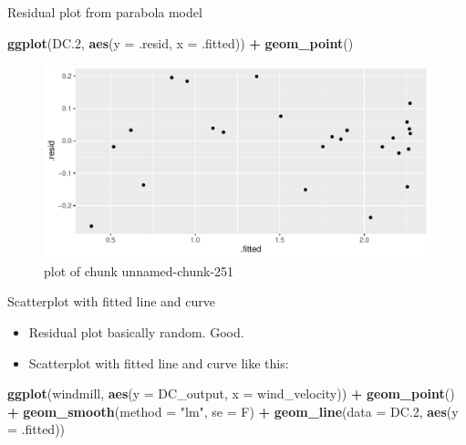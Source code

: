 \documentclass[
  ignorenonframetext,
]{beamer}
\newenvironment{Shaded}{\begin{snugshade}}{\end{snugshade}}
\newcommand{\DataTypeTok}[1]{\textcolor[rgb]{0.13,0.29,0.53}{#1}}
\newcommand{\FloatTok}[1]{\textcolor[rgb]{0.00,0.00,0.81}{#1}}
\newcommand{\KeywordTok}[1]{\textcolor[rgb]{0.13,0.29,0.53}{\textbf{#1}}}
\newcommand{\NormalTok}[1]{#1}
\newcommand{\OperatorTok}[1]{\textcolor[rgb]{0.81,0.36,0.00}{\textbf{#1}}}
\newcommand{\StringTok}[1]{\textcolor[rgb]{0.31,0.60,0.02}{#1}}
\providecommand{\tightlist}{%
  \setlength{\itemsep}{0pt}\setlength{\parskip}{0pt}}
\begin{document}
\begin{frame}[fragile]{Residual plot from parabola model}
\protect\hypertarget{residual-plot-from-parabola-model}{}

\begin{Shaded}
\begin{Highlighting}[]
\KeywordTok{ggplot}\NormalTok{(DC}\FloatTok{.2}\NormalTok{, }\KeywordTok{aes}\NormalTok{(}\DataTypeTok{y =}\NormalTok{ .resid, }\DataTypeTok{x =}\NormalTok{ .fitted)) }\OperatorTok{+}
\StringTok{  }\KeywordTok{geom_point}\NormalTok{()}
\end{Highlighting}
\end{Shaded}

\begin{figure}
\centering
\includegraphics{figure/unnamed-chunk-251-1.pdf}
\caption{plot of chunk unnamed-chunk-251}
\end{figure}

\end{frame}

\begin{frame}[fragile]{Scatterplot with fitted line and curve}
\protect\hypertarget{scatterplot-with-fitted-line-and-curve}{}

\begin{itemize}
\tightlist
\item
  Residual plot basically random. Good.
\item
  Scatterplot with fitted line and curve like this:
\end{itemize}

\begin{Shaded}
\begin{Highlighting}[]
\KeywordTok{ggplot}\NormalTok{(windmill, }\KeywordTok{aes}\NormalTok{(}\DataTypeTok{y =}\NormalTok{ DC_output, }\DataTypeTok{x =}\NormalTok{ wind_velocity)) }\OperatorTok{+}
\StringTok{  }\KeywordTok{geom_point}\NormalTok{() }\OperatorTok{+}\StringTok{ }\KeywordTok{geom_smooth}\NormalTok{(}\DataTypeTok{method =} \StringTok{"lm"}\NormalTok{, }\DataTypeTok{se =}\NormalTok{ F) }\OperatorTok{+}
\StringTok{  }\KeywordTok{geom_line}\NormalTok{(}\DataTypeTok{data =}\NormalTok{ DC}\FloatTok{.2}\NormalTok{, }\KeywordTok{aes}\NormalTok{(}\DataTypeTok{y =}\NormalTok{ .fitted))}
\end{Highlighting}
\end{Shaded}

\end{frame}
\end{document}
